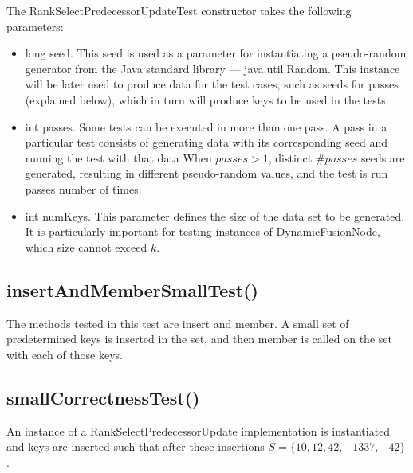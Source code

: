 The {\ttfamily RankSelectPredecessorUpdateTest} constructor takes the following parameters:
\begin{itemize}
    \item
    {\ttfamily long seed}.
    This seed is used as a parameter for instantiating a pseudo-random generator from the Java standard library --- {\ttfamily java.util.Random}.
    This instance will be later used to produce data for the test cases, such as seeds for passes (explained below), which in turn will produce keys to be used in the tests.
    
    \item {\ttfamily int passes}.
    Some tests can be executed in more than one pass. A pass in a particular test consists of generating data with its corresponding seed and running the test with that data
    When $passes > 1$, distinct $\#passes$ seeds are generated, resulting in different pseudo-random values, and the test is run {\ttfamily passes} number of times.
    
    \item {\ttfamily int numKeys}.
    This parameter defines the size of the data set to be generated.
    It is particularly important for testing instances of {\ttfamily DynamicFusionNode}, which size cannot exceed $k$.
\end{itemize}

\subsection{{\ttfamily insertAndMemberSmallTest()}} \label{sec:insertAndMemberSmallTest}
The methods tested in this test are {\ttfamily insert} and {\ttfamily member}. A small set of predetermined keys is inserted in the set, and then {\ttfamily member} is called on the set with each of those keys. 

\subsection{{\ttfamily smallCorrectnessTest()}}

An instance of a {\ttfamily RankSelectPredecessorUpdate} implementation is instantiated and keys are inserted such that after these insertions $S = \{10, 12, 42, -1337, -42\}$.

